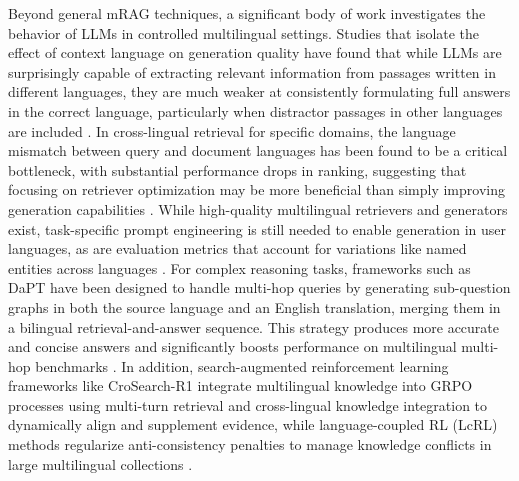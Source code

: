 \documentclass[11pt]{article}
\begin{document}
Beyond general mRAG techniques, a significant body of work investigates the behavior of LLMs in controlled multilingual settings. Studies that isolate the effect of context language on generation quality have found that while LLMs are surprisingly capable of extracting relevant information from passages written in different languages, they are much weaker at consistently formulating full answers in the correct language, particularly when distractor passages in other languages are included \cite{ref377}. In cross-lingual retrieval for specific domains, the language mismatch between query and document languages has been found to be a critical bottleneck, with substantial performance drops in ranking, suggesting that focusing on retriever optimization may be more beneficial than simply improving generation capabilities \cite{ref378}. While high-quality multilingual retrievers and generators exist, task-specific prompt engineering is still needed to enable generation in user languages, as are evaluation metrics that account for variations like named entities across languages \cite{ref379}. For complex reasoning tasks, frameworks such as DaPT have been designed to handle multi-hop queries by generating sub-question graphs in both the source language and an English translation, merging them in a bilingual retrieval-and-answer sequence. This strategy produces more accurate and concise answers and significantly boosts performance on multilingual multi-hop benchmarks \cite{ref380}. In addition, search-augmented reinforcement learning frameworks like CroSearch-R1 integrate multilingual knowledge into GRPO processes using multi-turn retrieval and cross-lingual knowledge integration to dynamically align and supplement evidence, while language-coupled RL (LcRL) methods regularize anti-consistency penalties to manage knowledge conflicts in large multilingual collections \cite{ref381,ref382}.
\end{document}
